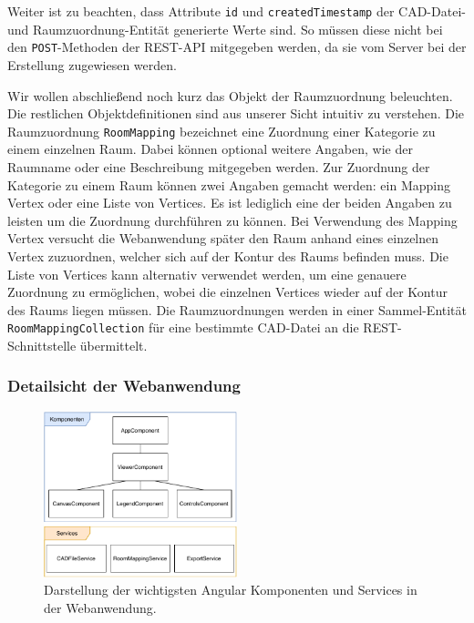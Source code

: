 Weiter ist zu beachten, dass Attribute \texttt{id} und \texttt{createdTimestamp} der CAD-Datei- und Raumzuordnung-Entität generierte Werte sind.
So müssen diese nicht bei den \texttt{POST}-Methoden der REST-API mitgegeben werden, da sie vom Server bei der Erstellung zugewiesen werden.

Wir wollen abschließend noch kurz das Objekt der Raumzuordnung beleuchten.
Die restlichen Objektdefinitionen sind aus unserer Sicht intuitiv zu verstehen.
Die Raumzuordnung \texttt{RoomMapping} bezeichnet eine Zuordnung einer Kategorie zu einem einzelnen Raum.
Dabei können optional weitere Angaben, wie der Raumname oder eine Beschreibung mitgegeben werden.
Zur Zuordnung der Kategorie zu einem Raum können zwei Angaben gemacht werden: ein Mapping Vertex oder eine Liste von Vertices.
Es ist lediglich eine der beiden Angaben zu leisten um die Zuordnung durchführen zu können.
Bei Verwendung des Mapping Vertex versucht die Webanwendung später den Raum anhand eines einzelnen Vertex zuzuordnen, welcher sich auf der Kontur des Raums befinden muss.
Die Liste von Vertices kann alternativ verwendet werden, um eine genauere Zuordnung zu ermöglichen, wobei die einzelnen Vertices wieder auf der Kontur des Raums liegen müssen.
Die Raumzuordnungen werden in einer Sammel-Entität \texttt{RoomMappingCollection} für eine bestimmte CAD-Datei an die REST-Schnittstelle übermittelt.

\subsubsection{Detailsicht der Webanwendung}
\label{subsubsec:detail-webapp}

\begin{figure}
    \includegraphics[width=0.5\textwidth]{res/frontend.pdf}
    \caption{Darstellung der wichtigsten Angular Komponenten und Services in der Webanwendung.}
    \label{fig:angular-components}
\end{figure}

